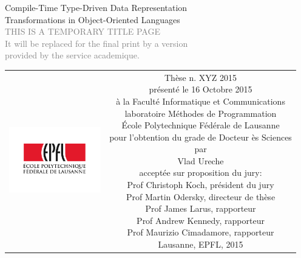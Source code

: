 \begin{titlepage}
\begin{center}
\sffamily


\null\vspace{2cm}
{\huge Compile-Time Type-Driven Data Representation\\[12pt] Transformations in Object-Oriented Languages} \\[24pt]
\textcolor{gray}{\small{THIS IS A TEMPORARY TITLE PAGE \\ It will be replaced for the final print by a version \\ provided by the service academique.}}

\vfill

\begin{tabular} {cc}
\parbox{0.3\textwidth}{\includegraphics[width=4cm]{images/epfl}}
&
\parbox{0.7\textwidth}{%
	Thèse n. XYZ 2015\\
	présenté le 16 Octobre 2015\\
	à la Faculté Informatique et Communications\\
	laboratoire Méthodes de Programmation\\[2em]
%
	École Polytechnique Fédérale de Lausanne\\[6pt]
	pour l'obtention du grade de Docteur ès Sciences\\
	par\\ [4pt]
	\null \hspace{3em} Vlad Ureche\\[9pt]
%
\small
acceptée sur proposition du jury:\\[4pt]
%
    Prof Christoph Koch, président du jury\\
    Prof Martin Odersky, directeur de thèse\\
    Prof James Larus, rapporteur\\
    Prof Andrew Kennedy, rapporteur\\
    Prof Maurizio Cimadamore, rapporteur\\[12pt]
%
Lausanne, EPFL, 2015}
\end{tabular}
\end{center}
\vspace{2cm}
\end{titlepage}



